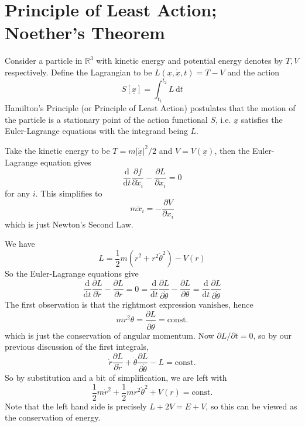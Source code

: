 \section{Principle of Least Action; Noether's Theorem}
Consider a particle in $\mathbb R^3$ with kinetic energy and potential energy denotes by $T,V$ respectively.
Define the Lagrangian to be $L(\underline{x},\underline{\dot{x}},t)=T-V$ and the action
$$S[\underline{x}]=\int_{t_1}^{t_2}L\,\mathrm dt$$
Hamilton's Principle (or Principle of Least Action) postulates that the motion of the particle is a stationary point of the action functional $S$, i.e. $\underline{x}$ satisfies the Euler-Lagrange equations with the integrand being $L$.
\begin{example}
    Take the kinetic energy to be $T=m|\underline{\dot{x}}|^2/2$ and $V=V(\underline{x})$, then the Euler-Lagrange equation gives
    $$\frac{\mathrm d}{\mathrm dt}\frac{\partial f}{\partial \dot{x}_i}-\frac{\partial L}{\partial x_i}=0$$
    for any $i$.
    This simplifies to
    $$m\ddot{x}_i=-\frac{\partial V}{\partial x_i}$$
    which is just Newton's Second Law.
\end{example}
\begin{example}
    We have
    $$L=\frac{1}{2}m(\dot{r}^2+r^2\dot{\theta}^2)-V(r)$$
    So the Euler-Lagrange equations give
    $$\frac{\mathrm d}{\mathrm dt}\frac{\partial L}{\partial \dot{r}}-\frac{\partial L}{\partial r}=0=\frac{\mathrm d}{\mathrm dt}\frac{\partial L}{\partial \dot{\theta}}-\frac{\partial L}{\partial \theta}=\frac{\mathrm d}{\mathrm dt}\frac{\partial L}{\partial \dot{\theta}}$$
    The first observation is that the rightmost expression vanishes, hence
    $$mr^2\dot{\theta}=\frac{\partial L}{\partial\dot{\theta}}=\text{const.}$$
    which is just the conservation of angular momentum.
    Now $\partial L/\partial t=0$, so by our previous discussion of the first integrals,
    $$\dot{r}\frac{\partial L}{\partial \dot{r}}+\dot{\theta}\frac{\partial L}{\partial\dot{\theta}}-L=\text{const.}$$
    So by substitution and a bit of simplification, we are left with
    $$\frac{1}{2}m\dot{r}^2+\frac{1}{2}mr^2\dot{\theta}^2+V(r)=\text{const.}$$
    Note that the left hand side is precisely $L+2V=E+V$, so this can be viewed as the conservation of energy.
\end{example}
